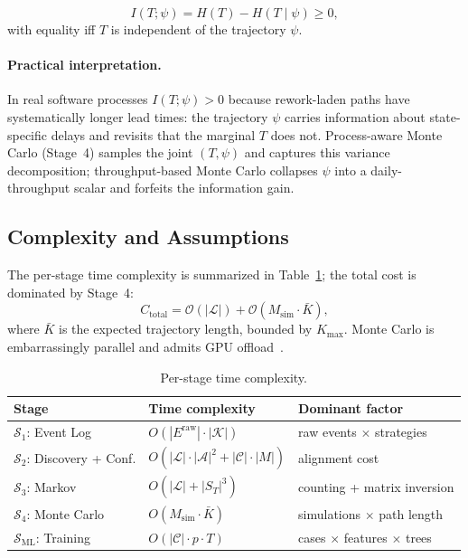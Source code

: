 \begin{theorem}
\label{thm:information}
\begin{equation}
\label{eq:information-gain}
I(T; \psi) = H(T) - H(T \mid \psi) \ge 0,
\end{equation}
with equality iff $T$ is independent of the trajectory $\psi$.
\end{theorem}

\paragraph{Practical interpretation.}
In real software processes $I(T;\psi) > 0$ because rework-laden paths
have systematically longer lead times: the trajectory $\psi$ carries
information about state-specific delays and revisits that the
marginal $T$ does not. Process-aware Monte Carlo (Stage~4) samples
the joint $(T, \psi)$ and captures this variance decomposition;
throughput-based Monte Carlo collapses $\psi$ into a daily-throughput
scalar and forfeits the information gain.

\subsection{Complexity and Assumptions}
\label{sec:prop-complexity}

The per-stage time complexity is summarized in
Table~\ref{tab:complexity}; the total cost is dominated by Stage~4:
\begin{equation}
\label{eq:total-cost}
C_{\text{total}} = \mathcal{O}(|\mathcal{L}|)
                 + \mathcal{O}(M_{\text{sim}} \cdot \bar{K}),
\end{equation}
where $\bar{K}$ is the expected trajectory length, bounded by
$K_{\max}$. Monte Carlo is embarrassingly parallel and admits GPU
offload~\cite{lecuyer2017random}.

\begin{table}[ht]
\centering
\caption{Per-stage time complexity.}
\label{tab:complexity}
\small
\begin{tabular}{@{}lll@{}}
\toprule
\textbf{Stage} & \textbf{Time complexity} & \textbf{Dominant factor} \\
\midrule
$\mathcal{S}_1$: Event Log     & $O(|E^{\text{raw}}| \cdot |\mathcal{K}|)$ & raw events $\times$ strategies \\
$\mathcal{S}_2$: Discovery + Conf. & $O(|\mathcal{L}| \cdot |\mathcal{A}|^2 + |\mathcal{C}| \cdot |M|)$ & alignment cost \\
$\mathcal{S}_3$: Markov         & $O(|\mathcal{L}| + |S_T|^3)$ & counting + matrix inversion \\
$\mathcal{S}_4$: Monte Carlo    & $O(M_{\text{sim}} \cdot \bar{K})$ & simulations $\times$ path length \\
$\mathcal{S}_{\text{ML}}$: Training & $O(|\mathcal{C}| \cdot p \cdot T)$ & cases $\times$ features $\times$ trees \\
\bottomrule
\end{tabular}
\end{table}

